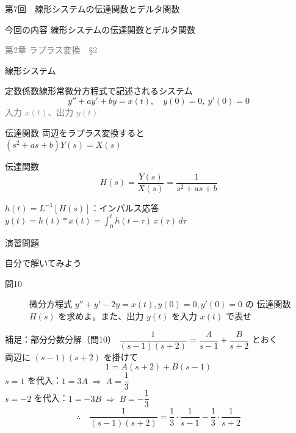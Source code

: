 \documentclass[professionalfonts]{beamer}
\begin{document}
\begin{frame}{第7回　線形システムの伝達関数とデルタ関数}
  \begin{block}{今回の内容}
  線形システムの伝達関数とデルタ関数
  \end{block}
  \vfill\hfill{\scriptsize \textcolor{gray}{第2章 ラプラス変換　§2}}
\end{frame}

\begin{frame}{線形システム}
  \begin{block}{定数係数線形常微分方程式で記述されるシステム}
  \[
    y'' + ay' + by = x(t), \quad y(0) = 0,\ y'(0) = 0
  \]
  {\footnotesize \textcolor{gray}{入力 $x(t)$、出力 $y(t)$}}
  \end{block}
\end{frame}

\begin{frame}{伝達関数}
  両辺をラプラス変換すると\\[4pt]
  $(s^{2} + as + b)Y(s) = X(s)$\\[8pt]
  \begin{block}{伝達関数}
  \[
    H(s) = \frac{Y(s)}{X(s)} = \frac{1}{s^{2} + as + b}
  \]
  \end{block}
  \vspace{4pt}
  $h(t) = L^{-1}[H(s)]$：インパルス応答\\[4pt]
  $y(t) = h(t) * x(t) = \displaystyle\int_{0}^t h(t-\tau)\, x(\tau)\, d\tau$
\end{frame}

\begin{frame}{演習問題}
  \begin{exampleblock}{自分で解いてみよう}
  \begin{description}
    \item[問10] 微分方程式 $y'' + y' - 2y = x(t), y(0)=0, y'(0)=0$ の
    伝達関数 $H(s)$ を求めよ。また、出力 $y(t)$ を入力 $x(t)$ で表せ\\
  \end{description}
  \end{exampleblock}
\end{frame}

\begin{frame}{補足：部分分数分解（問10）}
  $\dfrac{1}{(s-1)(s+2)} = \dfrac{A}{s-1} + \dfrac{B}{s+2}$ とおく\\[8pt]
  両辺に $(s-1)(s+2)$ を掛けて
  \[
    1 = A(s+2) + B(s-1)
  \]
  $s=1$ を代入：$1 = 3A \;\Rightarrow\; A = \dfrac{1}{3}$\\[6pt]
  $s=-2$ を代入：$1 = -3B \;\Rightarrow\; B = -\dfrac{1}{3}$\\[8pt]
  \[
    \therefore\quad \frac{1}{(s-1)(s+2)} = \frac{1}{3}\cdot\frac{1}{s-1} - \frac{1}{3}\cdot\frac{1}{s+2}
  \]
\end{frame}
\end{document}
